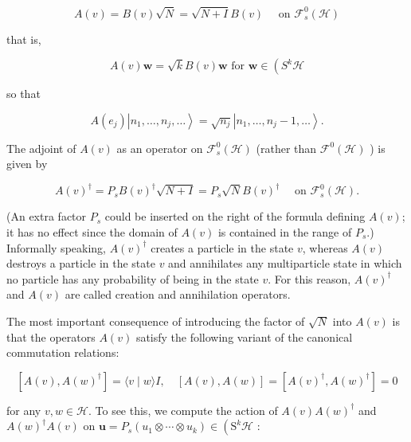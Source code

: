 \documentclass[10pt, letterpaper]{article}
\begin{document}
$$
A(v)=B(v) \sqrt{N}=\sqrt{N+I} B(v) \quad \text { on } \mathcal{F}_{s}^{0}(\mathcal{H})
$$

that is,

$$
A(v) \mathbf{w}=\sqrt{k} B(v) \mathbf{w} \text { for } \mathbf{w} \in\left(S^{k} \mathcal{H}\right.
$$

so that

$$
A\left(e_{j}\right)\left|n_{1}, \ldots, n_{j}, \ldots\right\rangle=\sqrt{n_{j}}\left|n_{1}, \ldots, n_{j}-1, \ldots\right\rangle .
$$

The adjoint of $A(v)$ as an operator on $\mathcal{F}_{s}^{0}(\mathcal{H})$ (rather than $\mathcal{F}^{0}(\mathcal{H})$ ) is given by

$$
A(v)^{\dagger}=P_{s} B(v)^{\dagger} \sqrt{N+I}=P_{s} \sqrt{N} B(v)^{\dagger} \quad \text { on } \mathcal{F}_{s}^{0}(\mathcal{H}) .
$$

(An extra factor $P_{s}$ could be inserted on the right of the formula defining $A(v)$; it has no effect since the domain of $A(v)$ is contained in the range of $P_{s}$.) Informally speaking, $A(v)^{\dagger}$ creates a particle in the state $v$, whereas $A(v)$ destroys a particle in the state $v$ and annihilates any multiparticle state in which no particle has any probability of being in the state $v$. For this reason, $A(v)^{\dagger}$ and $A(v)$ are called creation and annihilation operators.

The most important consequence of introducing the factor of $\sqrt{N}$ into $A(v)$ is that the operators $A(v)$ satisfy the following variant of the canonical commutation relations:

$$
\left[A(v), A(w)^{\dagger}\right]=\langle v \mid w\rangle I, \quad[A(v), A(w)]=\left[A(v)^{\dagger}, A(w)^{\dagger}\right]=0
$$

for any $v, w \in \mathcal{H}$. To see this, we compute the action of $A(v) A(w)^{\dagger}$ and $A(w)^{\dagger} A(v)$ on $\mathbf{u}=P_{s}\left(u_{1} \otimes \cdots \otimes u_{k}\right) \in\left(\mathrm{S}^{k} \mathcal{H}\right.$ :
\end{document}
